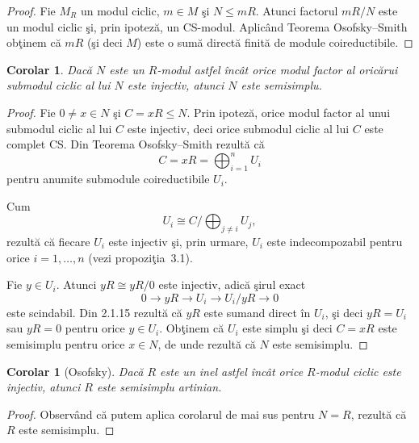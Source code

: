 \documentclass[12pt,a4paper]{book}
\theoremstyle{plain}
\newtheorem{corollary}[theorem]{Corolar}
\theoremstyle{definition}
\theoremstyle{remark}
\begin{document}
\begin{proof}
Fie \(M_R\) un modul ciclic, \(m \in M\) şi \(N \leq mR\).
Atunci factorul \(mR/N\) este un modul ciclic şi, prin ipoteză,
un CS-modul.
Aplicând Teorema Osofsky--Smith obţinem că
\(mR\) (şi deci \(M\)) este o sumă directă finită de module
coireductibile.
\end{proof}

\begin{corollary}
Dacă \(N\) este un \(R\)-modul astfel încât
orice modul factor al oricărui submodul ciclic al lui \(N\) este injectiv,
atunci \(N\) este semisimplu.
\end{corollary}

\begin{proof}
Fie \(0 \neq x \in N\) şi \(C = xR \leq N\).
Prin ipoteză, orice modul factor al unui submodul ciclic al lui \(C\)
este injectiv, deci orice submodul ciclic al lui \(C\) este complet CS.
Din Teorema Osofsky--Smith rezultă că
\[
C = xR = \bigoplus_{i=1}^n U_i
\]
pentru anumite submodule coireductibile \(U_i\).

Cum
\[
U_i \cong C \big/ \bigoplus_{j \neq i} U_j,
\]
rezultă că fiecare \(U_i\) este injectiv şi, prin urmare,
\(U_i\) este indecompozabil pentru orice \(i = 1,\dots,n\)
(vezi propoziţia~3.1).

Fie \(y \in U_i\). Atunci \(yR \cong yR/0\) este injectiv, adică şirul exact
\[
0 \longrightarrow yR \longrightarrow U_i \longrightarrow U_i / yR \longrightarrow 0
\]
este scindabil. Din 2.1.15 rezultă că \(yR\) este sumand direct în \(U_i\), şi deci
\(yR = U_i\) sau \(yR = 0\) pentru orice \(y \in U_i\).
Obţinem că \(U_i\) este simplu şi deci \(C = xR\) este semisimplu pentru orice
\(x \in N\), de unde rezultă că \(N\) este semisimplu.

\end{proof}

\begin{corollary}[Osofsky]\label{cor:5.9-RO}
Dacă \(R\) este un inel astfel încât orice \(R\)-modul ciclic este injectiv,
atunci \(R\) este semisimplu artinian.
\end{corollary}

\begin{proof}
Observând că putem aplica corolarul de mai sus pentru \(N = R\), rezultă că
\(R\) este semisimplu.
\end{proof}
\end{document}
